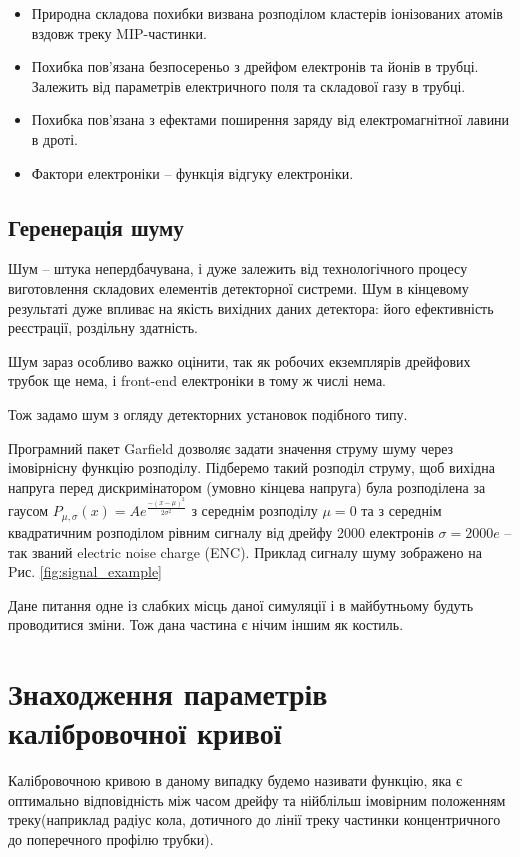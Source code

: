 \documentclass[]{article}
\begin{document}
	\begin{itemize}
		\item Природна складова похибки визвана розподілом кластерів іонізованих атомів вздовж треку MIP-частинки.\par
		\item Похибка пов’язана безпосереньо з дрейфом електронів та йонів в трубці. Залежить від параметрів електричного поля та складової газу в трубці.
		\item Похибка пов’язана з ефектами поширення заряду від електромагнітної лавини в дроті.
		\item Фактори електроніки -- функція відгуку електроніки.
	\end{itemize}
	
	\subsection{Геренерація шуму}
	Шум -- штука непердбачувана, і дуже залежить від технологічного процесу виготовлення складових елементів детекторної систреми. Шум в кінцевому результаті дуже впливає на якість вихідних даних детектора: його ефективність реєстрації, роздільну здатність.
	
	Шум зараз особливо важко оцінити, так як робочих екземплярів дрейфових трубок ще нема, і front-end електроніки в тому ж числі нема.
	
	Тож задамо шум з огляду детекторних установок подібного типу.
	
	Програмний пакет Garfield дозволяє задати значення струму шуму через імовірнісну функцію розподілу. Підберемо такий розподіл струму, щоб вихідна напруга перед дискримінатором (умовно кінцева напруга) була розподілена за гаусом 
	$P_{\mu,\sigma}(x) = Ae^{\frac{-(x-\mu)^2}{2\sigma^2}}$ 
	з середнім розподілу $\mu=0$ та з середнім квадратичним розподілом рівним сигналу від дрейфу 2000 електронів $ \sigma = 2000e$ -- так званий electric noise charge (ENC). Приклад сигналу шуму зображено на Pис. \ref{fig:signal_example}
	
	Дане питання одне із слабких місць даної симуляції і в майбутньому будуть проводитися зміни. Тож дана частина є нічим іншим як костиль.

	
	\section{Знаходження параметрів калібровочної кривої}
	
	Калібровочною кривою в даному випадку будемо називати функцію, яка є оптимально відповідність між часом дрейфу та нійблільш імовірним положенням треку(наприклад радіус кола, дотичного до лінії треку частинки концентричного до поперечного профілю трубки).\\
		
\end{document}
